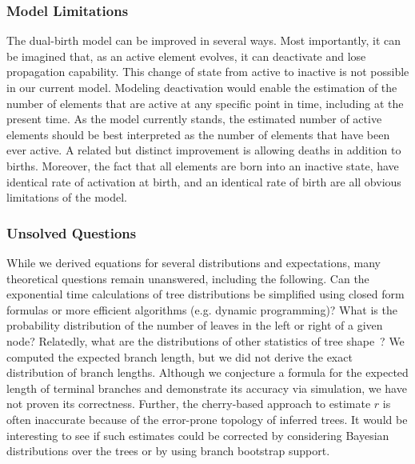 \subsubsection{Model Limitations}
The dual-birth model can be improved in several ways. Most importantly, it can be imagined that, as an active element evolves, it can deactivate and lose propagation capability. This change of state from  active  to inactive is not possible in our current model. Modeling deactivation would enable the estimation of the number of elements that are active at any specific point in time, including at the present time. As the model currently stands, the estimated number of active elements should be best interpreted as the number of elements that have been ever active. A related but distinct improvement is allowing deaths in addition to births. Moreover, the fact that all elements are born into an inactive state, have identical rate of activation at birth, and an identical rate of birth are all obvious limitations of the model.

\subsubsection{Unsolved Questions}
While we derived equations for several distributions and expectations, many theoretical questions remain unanswered, including the following. Can the exponential time calculations of tree distributions be simplified using closed form formulas or more efficient algorithms (e.g. dynamic programming)? What is the probability distribution of the number of leaves in the left or right of a given node? Relatedly, what are the distributions of other statistics of tree shape~\cite{Matsen2006,Matsen2007}? We computed the expected branch length, but we did not derive the exact distribution of branch lengths. Although we conjecture a formula for the expected length of terminal branches and demonstrate its accuracy via simulation, we have not proven its correctness. Further, the cherry-based approach to estimate $r$ is often inaccurate because of the error-prone topology of inferred trees. It would be interesting to see if such estimates could be corrected by considering Bayesian distributions over the trees or by using branch bootstrap support.

